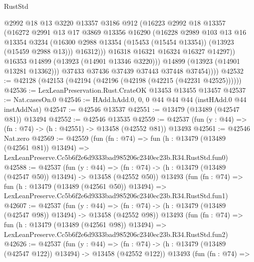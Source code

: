 \begin{lexlean}{RustStd}
\begin{coremodule}
                    @2992
                    @18
                    @13
                    @3220
                    @13357
                    @3186
                    @912
                    (@16223
                      @2992
                      @18
                      @13357
                      (@16272
                        @2991
                        @13
                        @17
                        @3869
                        @13356
                        @16290
                        (@16228
                          @2989
                          @103
                          @13
                          @16
                          @13354
                          @3234
                          (@16300 @2988 @13354 (@15453 (@15454 @13354)) (@13923 (@15459 @2988 @13)))
                          @16312)))
                    @16318
                    @16321
                    @16324
                    @16327
                    @14297))
                @16353
                @14899
                (@13923 (@14901 @13346 @3220)))
              @14899
              (@13923 (@14901 @13281 @13362)))
            @37433
            @37436
            @37439
            @37443
            @37448
            @37454))))
@42532 := @42128 (@42153 (@42194 (@42196 (@42198 (@42215 (@42231 @42525))))))
@42536 := LexLeanPreservation.Rust.CrateOK @13453 @13455 @13457
@42537 := Nat.casesOn.{0}
@42546 := HAdd.hAdd.{0, 0, 0} @44 @44 @44 (instHAdd.{0} @44 instAddNat)
@42547 := @42546 @13537
@42551 := @13479 (@13489 (@42547 @81)) @13494
@42552 := @42546 @13535
@42559 := @42537 (fun (y : @44) => (fn : @74) -> (h : @42551) -> @13458 (@42552 @81)) @13493
@42561 := @42546 Nat.zero
@42569 := @42559
    (fun (fn : @74) =>
    fun (h : @13479 (@13489 (@42561 @81)) @13494) =>
    LexLeanPreserve.Cc5b6f2e6d9333bad985206c2340ec23b.R34.RustStd.fun0)
@42588 := @42537
    (fun (y : @44) =>
    (fn : @74) -> (h : @13479 (@13489 (@42547 @50)) @13494) -> @13458 (@42552 @50))
    @13493
    (fun (fn : @74) =>
    fun (h : @13479 (@13489 (@42561 @50)) @13494) =>
    LexLeanPreserve.Cc5b6f2e6d9333bad985206c2340ec23b.R34.RustStd.fun1)
@42607 := @42537
    (fun (y : @44) =>
    (fn : @74) -> (h : @13479 (@13489 (@42547 @98)) @13494) -> @13458 (@42552 @98))
    @13493
    (fun (fn : @74) =>
    fun (h : @13479 (@13489 (@42561 @98)) @13494) =>
    LexLeanPreserve.Cc5b6f2e6d9333bad985206c2340ec23b.R34.RustStd.fun2)
@42626 := @42537
    (fun (y : @44) =>
    (fn : @74) -> (h : @13479 (@13489 (@42547 @122)) @13494) -> @13458 (@42552 @122))
    @13493
    (fun (fn : @74) =>

\end{coremodule}
\end{lexlean}
